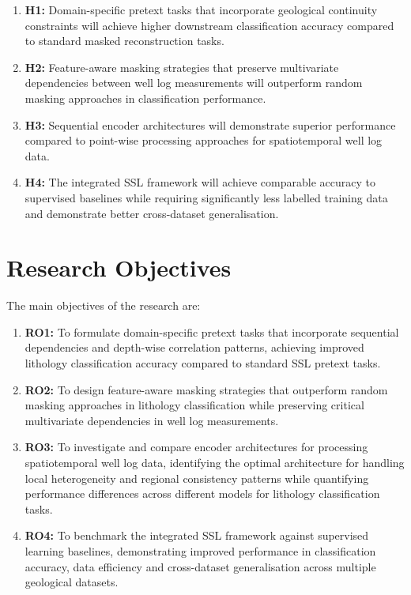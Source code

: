 \begin{enumerate}[label=\roman*.]
\item \textbf{H1:} Domain-specific pretext tasks that incorporate geological continuity constraints will achieve higher downstream classification accuracy compared to standard masked reconstruction tasks.

\item \textbf{H2:} Feature-aware masking strategies that preserve multivariate dependencies between well log measurements will outperform random masking approaches in classification performance.

\item \textbf{H3:} Sequential encoder architectures will demonstrate superior performance compared to point-wise processing approaches for spatiotemporal well log data.

\item \textbf{H4:} The integrated SSL framework will achieve comparable accuracy to supervised baselines while requiring significantly less labelled training data and demonstrate better cross-dataset generalisation.
\end{enumerate}


\section{Research Objectives}

The main objectives of the research are:

\begin{enumerate}[label=\roman*.]
\item \textbf{RO1:} To formulate domain-specific pretext tasks that incorporate sequential dependencies and depth-wise correlation patterns, achieving improved lithology classification accuracy compared to standard SSL pretext tasks.

\item \textbf{RO2:} To design feature-aware masking strategies that outperform random masking approaches in lithology classification while preserving critical multivariate dependencies in well log measurements.

\item \textbf{RO3:} To investigate and compare encoder architectures for processing spatiotemporal well log data, identifying the optimal architecture for handling local heterogeneity and regional consistency patterns while quantifying performance differences across different models for lithology classification tasks.

\item \textbf{RO4:} To benchmark the integrated SSL framework against supervised learning baselines, demonstrating improved performance in classification accuracy, data efficiency and cross-dataset generalisation across multiple geological datasets.
\end{enumerate}


